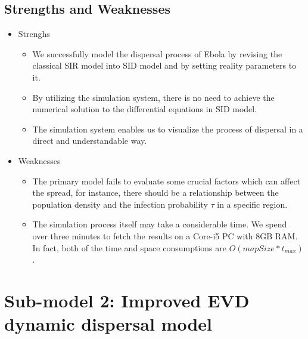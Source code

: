 \subsection{Strengths and Weaknesses}
\begin{itemize}
  \item Strenghs
  \begin{itemize}
    \item We successfully model the dispersal process of Ebola by revising the classical SIR model into SID model and by setting reality parameters to it.
    \item By utilizing the simulation system, there is no need to achieve the numerical solution to the differential equations in SID model.
    \item The simulation system enables us to visualize the process of dispersal in a direct and understandable way.
  \end{itemize}
  \item Weaknesses
  \begin{itemize}
    \item The primary model fails to evaluate some crucial factors which can affect the spread, for instance, there should be a relationship between the population density and the infection probability $\tau$ in a specific region.
    \item The simulation process itself may take a considerable time. We spend over three minutes to fetch the results on a Core-i5 PC with 8GB RAM. In fact, both of the time and space consumptions are $O(mapSize*t_{max})$.
  \end{itemize}
\end{itemize}

\section{Sub-model 2: Improved EVD dynamic dispersal model}
